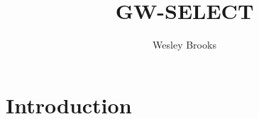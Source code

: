 \documentclass[authoryear, review, 11pt]{elsarticle}
\title{GW-SELECT}
\author{Wesley Brooks}
\date{}                                           %
\begin{document}
\maketitle





\section{Introduction}

	
\end{document}
